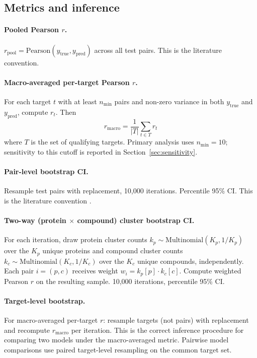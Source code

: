 \documentclass[11pt,a4paper]{article}
\begin{document}
\subsection{Metrics and inference}
\label{sec:methods-inference}

\paragraph{Pooled Pearson $r$.}
$r_\text{pool} = \text{Pearson}(y_\text{true}, y_\text{pred})$ across all test
pairs. This is the literature convention.

\paragraph{Macro-averaged per-target Pearson $r$.}
For each target $t$ with at least $n_\text{min}$ pairs and non-zero variance in
both $y_\text{true}$ and $y_\text{pred}$, compute $r_t$. Then
\[
  r_\text{macro} = \frac{1}{|T|} \sum_{t \in T} r_t
\]
where $T$ is the set of qualifying targets. Primary analysis uses
$n_\text{min} = 10$; sensitivity to this cutoff is reported in
Section~\ref{sec:sensitivity}.

\paragraph{Pair-level bootstrap CI.}
Resample test pairs with replacement, 10{,}000 iterations. Percentile 95\% CI.
This is the literature convention \citep{ozturk2018deepdta}.

\paragraph{Two-way (protein $\times$ compound) cluster bootstrap CI.}
For each iteration, draw protein cluster counts $k_p \sim
\text{Multinomial}(K_p, 1/K_p)$ over the $K_p$ unique proteins and compound
cluster counts $k_c \sim \text{Multinomial}(K_c, 1/K_c)$ over the $K_c$
unique compounds, independently.
Each pair $i = (p, c)$ receives weight $w_i = k_p[p] \cdot k_c[c]$.
Compute weighted Pearson $r$ on the resulting sample.
10{,}000 iterations, percentile 95\% CI.

\paragraph{Target-level bootstrap.}
For macro-averaged per-target $r$: resample targets (not pairs) with
replacement and recompute $r_\text{macro}$ per iteration. This is the correct
inference procedure for comparing two models under the macro-averaged metric.
Pairwise model comparisons use paired target-level resampling on the common
target set.
\end{document}
